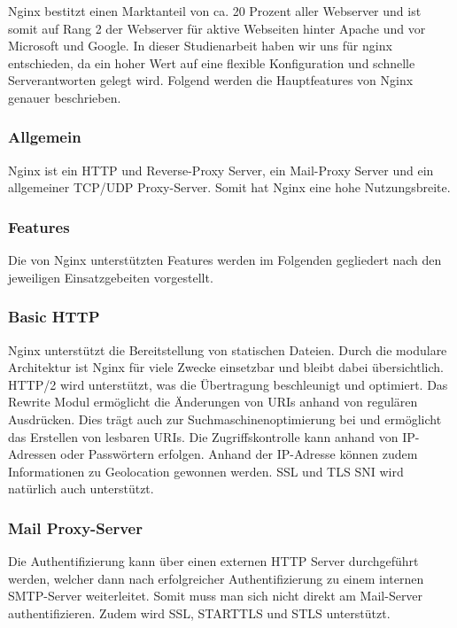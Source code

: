 Nginx bestitzt einen Marktanteil von ca. 20 Prozent aller Webserver und ist somit auf Rang 2 der Webserver für aktive Webseiten hinter Apache und vor Microsoft und Google\cite{.k}. In dieser Studienarbeit haben wir uns für nginx entschieden, da ein hoher Wert auf eine flexible Konfiguration und schnelle Serverantworten gelegt wird. Folgend werden die Hauptfeatures von Nginx genauer beschrieben.

\subsubsection{Allgemein}
\label{sec:NginxAllgemein}
Nginx ist ein HTTP und Reverse-Proxy Server, ein Mail-Proxy Server und ein allgemeiner TCP/UDP Proxy-Server. Somit hat Nginx eine hohe Nutzungsbreite.

\subsubsection{Features}
\label{sec:NginxFeatures}
Die von Nginx unterstützten Features werden im Folgenden gegliedert nach den jeweiligen Einsatzgebeiten vorgestellt.\cite{.14.03.2017}

\subsubsection{Basic HTTP}
\label{sec:NginxBasicHTTP}
Nginx unterstützt die Bereitstellung von statischen Dateien. Durch die modulare Architektur ist Nginx für viele Zwecke einsetzbar und bleibt dabei übersichtlich. HTTP/2 wird unterstützt, was die Übertragung beschleunigt und optimiert. Das Rewrite Modul ermöglicht die Änderungen von URIs anhand von regulären Ausdrücken. Dies trägt auch zur Suchmaschinenoptimierung bei und ermöglicht das Erstellen von lesbaren URIs. Die Zugriffskontrolle kann anhand von IP-Adressen oder Passwörtern erfolgen. Anhand der IP-Adresse können zudem Informationen zu Geolocation gewonnen werden. SSL und TLS SNI wird natürlich auch unterstützt.

\subsubsection{Mail Proxy-Server}
\label{sec:NginxMail Proxy-Server}
Die Authentifizierung kann über einen externen HTTP Server durchgeführt werden, welcher dann nach erfolgreicher Authentifizierung zu einem internen SMTP-Server weiterleitet. Somit muss man sich nicht direkt am Mail-Server authentifizieren. Zudem wird SSL, STARTTLS und STLS unterstützt.

